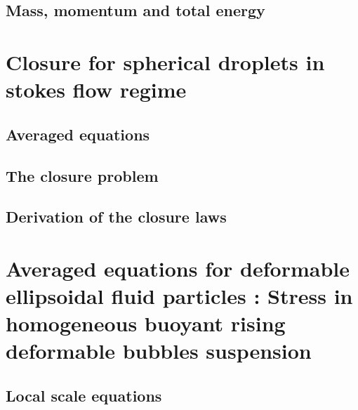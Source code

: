 \documentclass[12pt,a4paper,openany]{My_book}
\begin{document}
\section{Mass, momentum and total energy}
\label{ap:hypothesis}







\chapter{Closure for spherical droplets in stokes flow regime }
\label{chap:daniel2}
\localtableofcontents

\section{Averaged equations}


\section{The closure problem}
\label{ap:Closure_problem}


\section{Derivation of the closure laws}
\label{sec:application}


% 

\chapter{Averaged equations for deformable ellipsoidal fluid particles : Stress in homogeneous buoyant rising deformable bubbles suspension }
\localtableofcontents


\section{Local scale equations}



\end{document}
